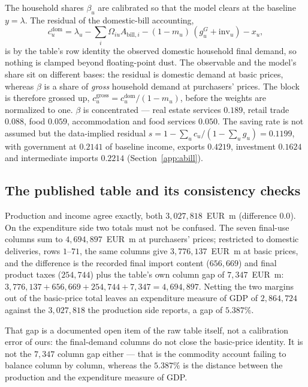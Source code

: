 The household shares $\beta_u$ are calibrated so that the model clears at the
baseline $y=\lambda$. The residual of the domestic-bill accounting,
\begin{equation}
c^{\mathrm{dom}}_u = \lambda_u - \sum_i \Omega_{iu} A_{\mathrm{bill},i}
  - (1-m_u)\,(g^G_u + \mathrm{inv}_u) - x_u ,
\label{eq:betaresid}
\end{equation}
is by the table's row identity the observed domestic household final demand, so
nothing is clamped beyond floating-point dust. The observable and the model's
share sit on different bases: the residual is domestic demand at basic prices,
whereas $\beta$ is a share of \emph{gross} household demand at purchasers'
prices. The block is therefore grossed up,
$c^{\mathrm{gross}}_u = c^{\mathrm{dom}}_u/(1-m_u)$, before the weights are
normalized to one. $\beta$ is concentrated --- real estate services $0.189$, retail trade $0.088$, food $0.059$, accommodation and food services $0.050$. The saving rate is not assumed but the data-implied residual
$s=1-\sum_u c_u/(1-\sum_u g_u)=0.1199$, with government at $0.2141$ of baseline
income, exports $0.4219$, investment $0.1624$ and intermediate imports $0.2214$
(Section~\ref{app:abill}).

\subsection{The published table and its consistency checks}\label{app:pipeline-checks}

Production and income agree exactly, both $3{,}027{,}818$~EUR~m (difference
$0.0$). On the expenditure side two totals must not be confused. The seven
final-use columns sum to $4{,}694{,}897$~EUR~m at purchasers' prices; restricted
to domestic deliveries, rows $1$--$71$, the same columns give
$3{,}776{,}137$~EUR~m at basic prices, and the difference is the recorded final
import content ($656{,}669$) and final product taxes ($254{,}744$) plus the
table's own column gap of $7{,}347$~EUR~m:
$3{,}776{,}137 + 656{,}669 + 254{,}744 + 7{,}347 = 4{,}694{,}897$. Netting the two
margins out of the basic-price total leaves an expenditure measure of GDP of
$2{,}864{,}724$ against the $3{,}027{,}818$ the production side reports, a gap of
$5.387\%$.

That gap is a documented open item of the raw table itself, not a calibration
error of ours: the final-demand columns do not close the basic-price identity.
It is not the $7{,}347$ column gap either --- that is the commodity account
failing to balance column by column, whereas the $5.387\%$ is the distance
between the production and the expenditure measure of GDP.

